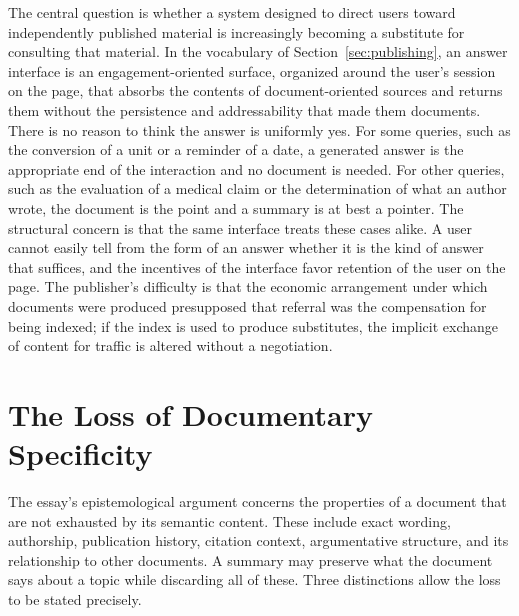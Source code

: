 \documentclass[11pt]{article}
\theoremstyle{remark}
\begin{document}
The central question is whether a system designed to direct users toward independently published material is increasingly becoming a substitute for consulting that material. In the vocabulary of Section~\ref{sec:publishing}, an answer interface is an engagement-oriented surface, organized around the user's session on the page, that absorbs the contents of document-oriented sources and returns them without the persistence and addressability that made them documents. There is no reason to think the answer is uniformly yes. For some queries, such as the conversion of a unit or a reminder of a date, a generated answer is the appropriate end of the interaction and no document is needed. For other queries, such as the evaluation of a medical claim or the determination of what an author wrote, the document is the point and a summary is at best a pointer. The structural concern is that the same interface treats these cases alike. A user cannot easily tell from the form of an answer whether it is the kind of answer that suffices, and the incentives of the interface favor retention of the user on the page. The publisher's difficulty is that the economic arrangement under which documents were produced presupposed that referral was the compensation for being indexed; if the index is used to produce substitutes, the implicit exchange of content for traffic is altered without a negotiation.

\section{The Loss of Documentary Specificity}

The essay's epistemological argument concerns the properties of a document that are not exhausted by its semantic content. These include exact wording, authorship, publication history, citation context, argumentative structure, and its relationship to other documents. A summary may preserve what the document says about a topic while discarding all of these. Three distinctions allow the loss to be stated precisely.
\end{document}
